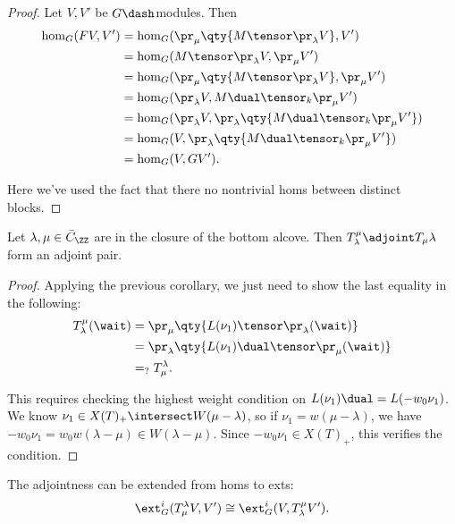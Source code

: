 \begin{proof}

Let \(V, V'\) be \(G\dash\)modules. Then
\begin{align*}  
\hom_G(FV, V') 
&= \hom_G( \pr_\mu\qty{ M\tensor \pr_\lambda V  }, V') \\
&= \hom_G(  M\tensor \pr_\lambda V  , \pr_\mu V') \\
&= \hom_G(  \pr_\mu \qty{ M\tensor \pr_\lambda V }  , \pr_\mu V') \\
&= \hom_G(  \pr_\lambda V  , M\dual \tensor_k \pr_\mu V') \\
&= \hom_G(  \pr_\lambda V  , \pr_\lambda\qty{ M\dual \tensor_k \pr_\mu V'} ) \\
&= \hom_G(  V  , \pr_\lambda\qty{ M\dual \tensor_k \pr_\mu V'} ) \\
&= \hom_G(V, GV')
.\end{align*}

Here we've used the fact that there no nontrivial homs between distinct
blocks.

\end{proof}

\begin{theorem}[?]

Let \(\lambda, \mu \in \bar{C}_\ZZ\) are in the closure of the bottom
alcove. Then \(T_\lambda^\mu \adjoint T_\mu \lambda\) form an adjoint
pair.

\end{theorem}

\begin{proof}

Applying the previous corollary, we just need to show the last equality
in the following:
\begin{align*}  
T_\lambda^\mu(\wait) 
&= \pr_\mu \qty{ L(\nu_1) \tensor \pr_\lambda(\wait) } \\
&= \pr_\lambda \qty{ L(\nu_1)\dual \tensor \pr_\mu(\wait) } \\
&=_? T_\mu^\lambda
.\end{align*}

This requires checking the highest weight condition on
\(L(\nu_1)\dual = L(-w_0 \nu_1)\). We know
\(\nu_1 \in X(T)_+ \intersect W(\mu-\lambda)\), so if
\(\nu_1 = w(\mu-\lambda)\), we have
\(-w_0 \nu_1 = w_0 w (\lambda - \mu) \in W(\lambda - \mu)\). Since
\(-w_0 \nu_1 \in X(T)_+\), this verifies the condition.

\end{proof}

\begin{remark}

The adjointness can be extended from homs to exts:
\begin{align*}  
\ext_G^i(T_\mu^\lambda V, V' ) \cong \ext_G^i(V, T_\lambda^\mu V')
.\end{align*}

\end{remark}

